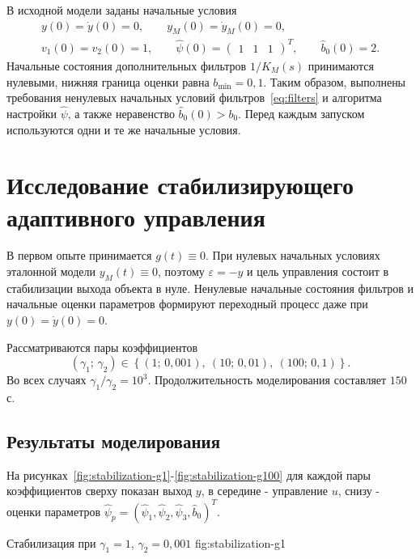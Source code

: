 В исходной модели заданы начальные условия
\begin{equation}
  \begin{gathered}
    y(0)=\dot y(0)=0,\qquad
    y_M(0)=\dot y_M(0)=0,\\
    v_1(0)=v_2(0)=1,\qquad
    \hat\psi(0)=\begin{pmatrix}1&1&1\end{pmatrix}^{T},
    \qquad \hat b_0(0)=2.
  \end{gathered}
  \label{eq:initial-conditions}
\end{equation}
Начальные состояния дополнительных фильтров $1/K_M(s)$
принимаются нулевыми, нижняя граница оценки равна
$b_{\min}=0{,}1$.
Таким образом, выполнены требования ненулевых начальных условий
фильтров~\eqref{eq:filters} и алгоритма настройки $\hat\psi$,
а также неравенство $\hat b_0(0)>b_0$.
Перед каждым запуском используются одни и те же начальные условия.

\section{Исследование стабилизирующего адаптивного управления}

В первом опыте принимается $g(t)\equiv0$.
При нулевых начальных условиях эталонной модели $y_M(t)\equiv0$,
поэтому $\varepsilon=-y$ и цель управления состоит в стабилизации
выхода объекта в нуле. Ненулевые начальные состояния фильтров
и начальные оценки параметров формируют переходный процесс
даже при $y(0)=\dot y(0)=0$.

Рассматриваются пары коэффициентов
\begin{equation}
  (\gamma_1;\,\gamma_2)\in
  \left\{(1;\,0{,}001),\ (10;\,0{,}01),\ (100;\,0{,}1)\right\}.
  \label{eq:gain-set}
\end{equation}
Во всех случаях $\gamma_1/\gamma_2=10^3$.
Продолжительность моделирования составляет $150$ с.

\subsection{Результаты моделирования}

На рисунках~\ref{fig:stabilization-g1}-\ref{fig:stabilization-g100}
для каждой пары коэффициентов сверху показан выход $y$,
в середине - управление $u$, снизу - оценки параметров
$\hat\psi_p=(\hat\psi_1,\hat\psi_2,\hat\psi_3,\hat b_0)^{T}$.

  {Стабилизация при $\gamma_1=1$, $\gamma_2=0{,}001$}
  {fig:stabilization-g1}

